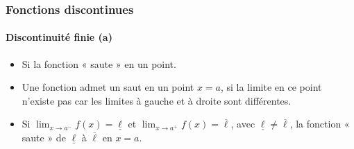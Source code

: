 \documentclass[10pt,notheorems]{beamer}
\theoremstyle{plain}
\theoremstyle{definition} %
\begin{document}
\begin{frame}
  \frametitle{Fonctions discontinues}
  \framesubtitle{Discontinuité finie (a)}

  \begin{itemize}

  \item Si la fonction « saute » en un point.\newline

  \item Une fonction admet un saut en un point $x = a$, si la limite en ce point n'existe pas car les limites à gauche et à droite sont différentes.\newline

  \item Si $\lim_{x\rightarrow a^-}f(x) = \underline{\ell}$ et $\lim_{x\rightarrow a^+}f(x) = \overline{\ell}$, avec $\underline{\ell}\neq\overline{\ell}$, la fonction « saute » de $\underline{\ell}$ à $\overline{\ell}$ en $x=a$.\newline

  \end{itemize}

\end{frame}
\end{document}
